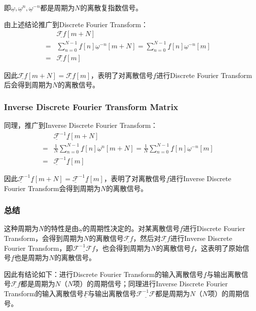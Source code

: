即$\underline{\omega},\underline{\omega}^n,\underline{\omega}^{-n}$都是周期为$N$的离散复指数信号。


由上述结论推广到Discrete Fourier Transform：
\begin{align*}
	  & \underline{\mathcal{F}f}[m+N]                                \\
	= & \sum_{n=0}^{N-1}\underline{f}[n]\underline{\omega}^{-n}[m+N]
	= \sum_{n=0}^{N-1}\underline{f}[n]\underline{\omega}^{-n}[m]     \\
	= & \underline{\mathcal{F}f}[m]
\end{align*}

因此$\underline{\mathcal{F}f}[m+N] = \underline{\mathcal{F}f}[m]$，表明了对离散信号$\underline{f}$进行Discrete Fourier Transform后会得到周期为$N$的离散信号。

\subsubsection{Inverse Discrete Fourier Transform Matrix}

同理，推广到Inverse Discrete Fourier Transform：
\begin{align*}
	  & \underline{\mathcal{F}}^{-1}\underline{f}[m+N]                                                                                                \\
	= & \frac{1}{N}\sum_{n=0}^{N-1}\underline{f}[n]\underline{\omega}^{n}[m+N]= \frac{1}{N}\sum_{n=0}^{N-1}\underline{f}[n]\underline{\omega}^{-n}[m] \\
	= & \underline{\mathcal{F}}^{-1}\underline{f}[m]
\end{align*}

因此$\underline{\mathcal{F}}^{-1}\underline{f}[m+N] = \underline{\mathcal{F}}^{-1}\underline{f}[m]$，表明了对离散信号$\underline{f}$进行Inverse Discrete Fourier Transform会得到周期为$N$的离散信号。
\subsubsection{总结}
这种周期为$N$的特性是由$\underline{\omega}$的周期性决定的。对某离散信号$\underline{f}$进行Discrete Fourier Transform，会得到周期为$N$的离散信号$\underline{\mathcal{F}f}$，然后对$\underline{\mathcal{F}f}$进行Inverse Discrete Fourier Transform，即$\underline{\mathcal{F}^{-1}\mathcal{F}f}$，也会得到周期为$N$的离散信号$\underline{f}$，这表明了原始信号$\underline{f}$也是周期为$N$的离散信号。

因此有结论如下：进行Discrete Fourier Transform的输入离散信号$\underline{f}$与输出离散信号$\underline{\mathcal{F}f}$都是周期为$N$（$N$项）的周期信号；同理进行Inverse Discrete Fourier Transform的输入离散信号$\underline{F}$与输出离散信号$\underline{\mathcal{F}^{-1}\mathcal{F}}$都是周期为$N$（$N$项）的周期信号。


